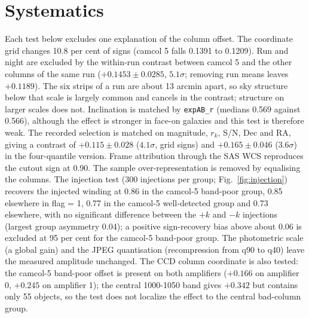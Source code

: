 \documentclass[preprint,12pt,authoryear]{elsarticle}
\begin{document}
\section{Systematics}
Each test below excludes one explanation of the column offset. The coordinate grid changes 10.8 per
cent of signs (camcol 5 falls 0.1391 to 0.1209). Run and night are excluded by the within-run contrast between camcol 5 and the other columns of the
same run ($+0.1453 \pm 0.0285$, $5.1\sigma$; removing run means leaves $+0.1189$). The six strips of a
run are about 13 arcmin apart, so sky structure below that scale is largely common and cancels in
the contrast; structure on larger scales does not. Inclination is matched by \texttt{expAB\_r} (medians
0.569 against 0.566), although the effect is stronger in face-on galaxies and this test is
therefore weak. The recorded selection is matched on magnitude, $r_k$, S/N, Dec and RA, giving a
contrast of $+0.115 \pm 0.028$ ($4.1\sigma$, grid signs) and $+0.165 \pm 0.046$ ($3.6\sigma$) in the
four-quantile version. Frame attribution through the SAS WCS reproduces the cutout sign at 0.90.
The sample over-representation is removed by equalising the columns. The injection test (300 injections per group; Fig.~\ref{fig:injection}) recovers the injected
winding at 0.86 in the camcol-5 band-poor group, 0.85 elsewhere in flag = 1, 0.77 in the camcol-5
well-detected group and 0.73 elsewhere, with no significant difference between the $+k$ and $-k$
injections (largest group asymmetry 0.04); a positive sign-recovery bias above about 0.06 is
excluded at 95 per cent for the camcol-5 band-poor group. The photometric scale (a global gain) and the JPEG quantisation (recompression from q90 to
q40) leave the measured amplitude unchanged. The CCD column coordinate is also tested: the camcol-5 band-poor offset is present on both
amplifiers ($+0.166$ on amplifier 0, $+0.245$ on amplifier 1); the central 1000-1050 band gives
$+0.342$ but contains only 55 objects, so the test does not localize the effect to the central
bad-column group.
\end{document}
